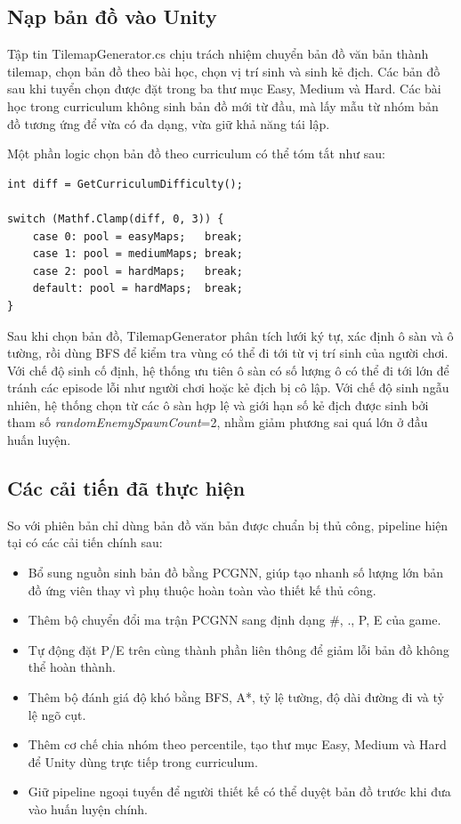 \subsection{Nạp bản đồ vào Unity}

Tập tin TilemapGenerator.cs chịu trách nhiệm chuyển bản đồ văn bản thành tilemap, chọn bản đồ theo bài học, chọn vị trí sinh và sinh kẻ địch. Các bản đồ sau khi tuyển chọn được đặt trong ba thư mục Easy, Medium và Hard. Các bài học trong curriculum không sinh bản đồ mới từ đầu, mà lấy mẫu từ nhóm bản đồ tương ứng để vừa có đa dạng, vừa giữ khả năng tái lập.

Một phần logic chọn bản đồ theo curriculum có thể tóm tắt như sau:

\begin{lstlisting}
int diff = GetCurriculumDifficulty();

switch (Mathf.Clamp(diff, 0, 3)) {
    case 0: pool = easyMaps;   break;
    case 1: pool = mediumMaps; break;
    case 2: pool = hardMaps;   break;
    default: pool = hardMaps;  break;
}
\end{lstlisting}

Sau khi chọn bản đồ, TilemapGenerator phân tích lưới ký tự, xác định ô sàn và ô tường, rồi dùng BFS để kiểm tra vùng có thể đi tới từ vị trí sinh của người chơi. Với chế độ sinh cố định, hệ thống ưu tiên ô sàn có số lượng ô có thể đi tới lớn để tránh các episode lỗi như người chơi hoặc kẻ địch bị cô lập. Với chế độ sinh ngẫu nhiên, hệ thống chọn từ các ô sàn hợp lệ và giới hạn số kẻ địch được sinh bởi tham số \emph{randomEnemySpawnCount}=2, nhằm giảm phương sai quá lớn ở đầu huấn luyện.

\subsection{Các cải tiến đã thực hiện}

So với phiên bản chỉ dùng bản đồ văn bản được chuẩn bị thủ công, pipeline hiện tại có các cải tiến chính sau:

\begin{itemize}
    \item Bổ sung nguồn sinh bản đồ bằng PCGNN, giúp tạo nhanh số lượng lớn bản đồ ứng viên thay vì phụ thuộc hoàn toàn vào thiết kế thủ công.
    \item Thêm bộ chuyển đổi ma trận PCGNN sang định dạng \#, ., P, E của game.
    \item Tự động đặt P/E trên cùng thành phần liên thông để giảm lỗi bản đồ không thể hoàn thành.
    \item Thêm bộ đánh giá độ khó bằng BFS, A*, tỷ lệ tường, độ dài đường đi và tỷ lệ ngõ cụt.
    \item Thêm cơ chế chia nhóm theo percentile, tạo thư mục Easy, Medium và Hard để Unity dùng trực tiếp trong curriculum.
    \item Giữ pipeline ngoại tuyến để người thiết kế có thể duyệt bản đồ trước khi đưa vào huấn luyện chính.
\end{itemize}


